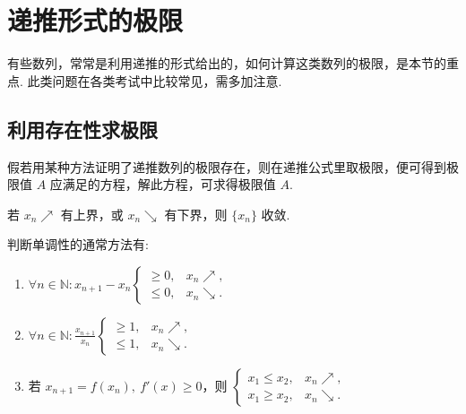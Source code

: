 \section{递推形式的极限}

有些数列，常常是利用递推的形式给出的，如何计算这类数列的极限，是本节的重点.
此类问题在各类考试中比较常见，需多加注意.

\subsection{利用存在性求极限}

假若用某种方法证明了递推数列的极限存在，则在递推公式里取极限，便可得到极限值 $A$ 应满足的方程，解此方程，可求得极限值 $A$.

\begin{theorem}[单调有界准理]
    若 $x_n\nearrow$ 有上界，或 $x_n\searrow$ 有下界，则 $\{x_n\}$ 收敛.
\end{theorem}
判断单调性的通常方法有:
\begin{enumerate}[label=(\arabic{*})]
    \item $\displaystyle\forall n\in \mathbb{N}:x_{n+1}-x_n\begin{cases}\geqslant 0,&x_n\nearrow,\\ \leqslant 0,&x_n\searrow.\end{cases}$
    \item $\displaystyle\forall n\in\mathbb{N}:\frac{x_{n+1}}{x_n}\begin{cases}\geqslant 1,&x_n\nearrow,\\ \leqslant 1,&x_n\searrow.\end{cases}$
    \item 若 $x_{n+1}=f(x_n),~f'(x)\geqslant 0\text{，则 }\begin{cases}x_1\leqslant x_2,&x_n\nearrow,\\ x_1\geqslant x_2,&x_n\searrow.\end{cases} $
\end{enumerate}

